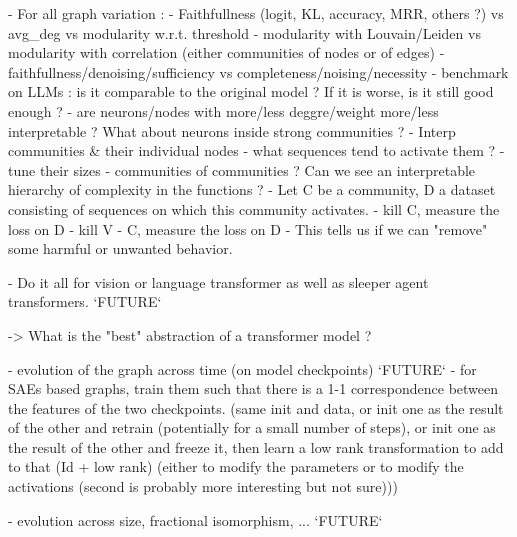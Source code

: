 \documentclass{article}
\begin{document}
- For all graph variation :
    - Faithfullness (logit, KL, accuracy, MRR, others ?) vs avg_deg vs modularity w.r.t. threshold
        - modularity with Louvain/Leiden vs modularity with correlation (either communities of nodes or of edges)
        - faithfullness/denoising/sufficiency vs completeness/noising/necessity
    - benchmark on LLMs : is it comparable to the original model ? If it is worse, is it still good enough ?
    - are neurons/nodes with more/less deggre/weight more/less interpretable ? What about neurons inside strong communities ?
    - Interp communities & their individual nodes
        - what sequences tend to activate them ?
        - tune their sizes
        - communities of communities ? Can we see an interpretable hierarchy of complexity in the functions ?
    - Let C be a community, D a dataset consisting of sequences on which this community activates.
        - kill C, measure the loss on D
        - kill V - C, measure the loss on D
        - This tells us if we can "remove" some harmful or unwanted behavior.

        
- Do it all for vision or language transformer as well as sleeper agent transformers. `FUTURE`

-> What is the "best" abstraction of a transformer model ?

- evolution of the graph across time (on model checkpoints) `FUTURE`
    - for SAEs based graphs, train them such that there is a 1-1 correspondence between the features of the two checkpoints. (same init and data, or init one as the result of the other and retrain (potentially for a small number of steps), or init one as the result of the other and freeze it, then learn a low rank transformation to add to that (Id + low rank) (either to modify the parameters or to modify the activations (second is probably more interesting but not sure)))

- evolution across size, fractional isomorphism, ... `FUTURE`




\end{document}
